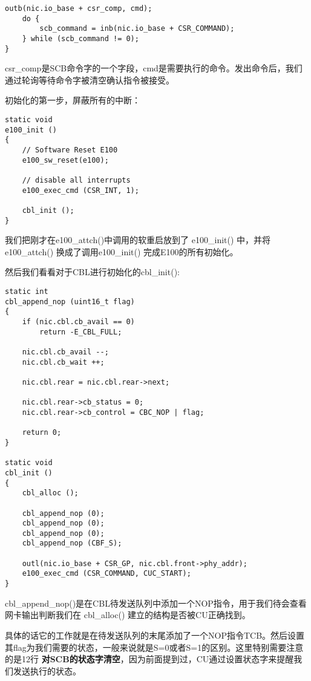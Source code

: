 \documentclass{article}
\newcommand{\highlight}[1]{{\bfseries \color{red}  #1}}
\newcommand{\funcname}[1]{{\ttfamily \small #1}}
\begin{document}
\begin{CJK*}{UTF8}{gkai}
\begin{lstlisting}[style=ccode, title={\scriptsize \ttfamily \bfseries kern/e100.c: e100\_exec\_cmd()}]
    outb(nic.io_base + csr_comp, cmd);
    do {
        scb_command = inb(nic.io_base + CSR_COMMAND);
    } while (scb_command != 0);
}
\end{lstlisting}

csr\_comp是SCB命令字的一个字段，cmd是需要执行的命令。发出命令后，我们通过轮询等待命令字被清空确认指令被接受。

初始化的第一步，屏蔽所有的中断：

\begin{lstlisting}[style=ccode, title={\scriptsize \ttfamily \bfseries kern/e100.c: e100\_init()}]
static void
e100_init ()
{
    // Software Reset E100
    e100_sw_reset(e100);

    // disable all interrupts
    e100_exec_cmd (CSR_INT, 1);

    cbl_init ();
}
\end{lstlisting}

我们把刚才在\funcname{e100\_attch()}中调用的软重启放到了 \funcname{e100\_init()} 中，并将 \funcname{e100\_attch()} 换成了调用\funcname{e100\_init()} 完成E100的所有初始化。

然后我们看看对于CBL进行初始化的\funcname{cbl\_init()}:

\begin{lstlisting}[style=ccode, title={\scriptsize \ttfamily \bfseries kern/e100.c}]
static int
cbl_append_nop (uint16_t flag)
{
    if (nic.cbl.cb_avail == 0)
        return -E_CBL_FULL;

    nic.cbl.cb_avail --;
    nic.cbl.cb_wait ++;

    nic.cbl.rear = nic.cbl.rear->next;

    nic.cbl.rear->cb_status = 0;
    nic.cbl.rear->cb_control = CBC_NOP | flag;

    return 0;
}

static void
cbl_init () 
{
    cbl_alloc ();

    cbl_append_nop (0);
    cbl_append_nop (0);
    cbl_append_nop (0);
    cbl_append_nop (CBF_S);

    outl(nic.io_base + CSR_GP, nic.cbl.front->phy_addr);
    e100_exec_cmd (CSR_COMMAND, CUC_START); 
}
\end{lstlisting}

\funcname{cbl\_append\_nop()}是在CBL待发送队列中添加一个NOP指令，用于我们待会查看网卡输出判断我们在 \funcname{cbl\_alloc()} 建立的结构是否被CU正确找到。

具体的话它的工作就是在待发送队列的末尾添加了一个NOP指令TCB。然后设置其flag为我们需要的状态，一般来说就是S=0或者S=1的区别。这里特别需要注意的是12行\highlight{对SCB的状态字清空}，因为前面提到过，CU通过设置状态字来提醒我们发送执行的状态。


\end{CJK*}
\end{document}

